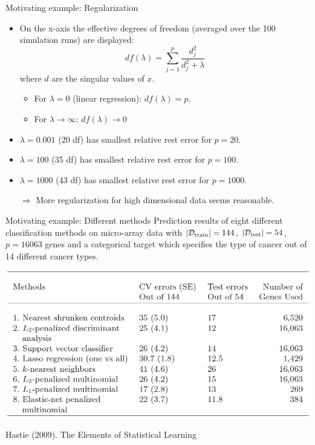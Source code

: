 \documentclass[11pt,compress,t,notes=noshow, xcolor=table]{beamer}
\begin{document}
\begin{vbframe}{Motivating example: Regularization}
  \begin{itemize}
  \item On the x-axis the effective degrees of freedom (averaged over the 100 simulation runs) are displayed:
  $$df(\lambda) = \sum_{j=1}^p \frac{d_j^2}{d^2_j + \lambda}$$
  where $d$ are the singular values of $x$.
  \begin{itemize}
    \item For $\lambda = 0$ (linear regression): $df(\lambda) = p$.
    \item For $\lambda \rightarrow \infty$: $df(\lambda) \rightarrow 0$
  \end{itemize}
  \item $\lambda = 0.001$ (20 df) has smallest relative rest error for $p = 20$.
  \item $\lambda = 100$ (35 df) has smallest relative rest error for $p = 100$.
  \item $\lambda = 1000$ (43 df) has smallest relative rest error for $p = 1000$.
  \item[$\Rightarrow$] More regularization for high dimensional data seems reasonable.
  \end{itemize}
  \end{vbframe}

  \begin{vbframe}{Motivating example: Different methods}
  Prediction results of eight different classification methods on micro-array data with $| \mathcal{D}_{\text{train}} | = 144$, $| \mathcal{D}_{\text{test}} | = 54$, $p=16 063$ genes and a categorical target which specifies the type of cancer out of 14 different cancer types.

  \begin{center}
  \includegraphics{figure_man/tibshirani_tab_18_1.png}

  \footnotesize{Hastie (2009). The Elements of Statistical Learning}
  \end{center}
  \end{vbframe}
\end{document}
